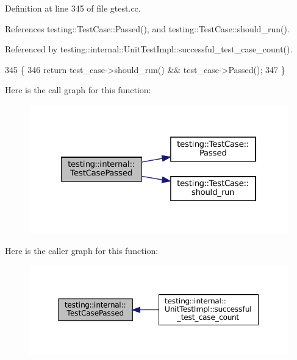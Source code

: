 Definition at line 345 of file gtest.\+cc.



References testing\+::\+Test\+Case\+::\+Passed(), and testing\+::\+Test\+Case\+::should\+\_\+run().



Referenced by testing\+::internal\+::\+Unit\+Test\+Impl\+::successful\+\_\+test\+\_\+case\+\_\+count().


\begin{DoxyCode}
345                                                       \{
346   \textcolor{keywordflow}{return} test\_case->should\_run() && test\_case->Passed();
347 \}
\end{DoxyCode}
Here is the call graph for this function\+:
\nopagebreak
\begin{figure}[H]
\begin{center}
\leavevmode
\includegraphics[width=322pt]{namespacetesting_1_1internal_aadc7afca7aab40f7f1d41bc17974459a_cgraph}
\end{center}
\end{figure}
Here is the caller graph for this function\+:
\nopagebreak
\begin{figure}[H]
\begin{center}
\leavevmode
\includegraphics[width=350pt]{namespacetesting_1_1internal_aadc7afca7aab40f7f1d41bc17974459a_icgraph}
\end{center}
\end{figure}
\mbox{\label{namespacetesting_1_1internal_ad9c627ef2a94245e3fd69e7ab3d49b42}} 
